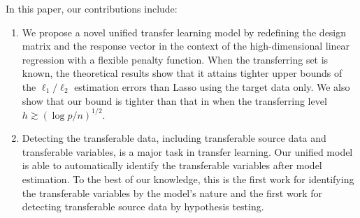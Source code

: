 \documentclass[twoside,12pt]{article}
\begin{document}
    In this paper, our contributions include:
\begin{enumerate}
	\item We propose a novel unified transfer learning model by redefining the design matrix and the response vector in the context of the high-dimensional linear regression with a flexible penalty function.
	When the transferring set is known, the theoretical results show that it attains tighter upper bounds of the $\ell_1/\ell_2$ estimation errors than Lasso using the target data only.
	We also show that our bound is tighter than that in \citet{tian2022transfer} when the transferring level $h\gtrsim(\log p/n)^{1/2}$.
	\item Detecting the transferable data, including transferable source data and transferable variables, is a major task in transfer learning.
	Our unified model is able to automatically identify the transferable variables after model estimation.
	To the best of our knowledge, this is the first work for identifying the transferable variables by the model's nature and the first work for detecting transferable source data by hypothesis testing.
	 
\end{enumerate}
	
	
\end{document}
